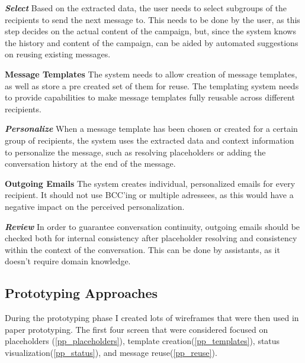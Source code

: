 \textbf{\emph{Select}}
Based on the extracted data, the user needs to select subgroups of the recipients to send the next message to. This needs to be done by the user, as this step decides on the actual content of the campaign, but, since the system knows the history and content of the campaign, can be aided by automated suggestions on reusing existing messages.

\textbf{Message Templates}
The system needs to allow creation of message templates, as well as store a pre created set of them for reuse. The templating system needs to provide capabilities to make message templates fully reusable across different recipients.

\textbf{\emph{Personalize}}
When a message template has been chosen or created for a certain group of recipients, the system uses the extracted data and context information to personalize the message, such as resolving placeholders or adding the conversation history at the end of the message.

\textbf{Outgoing Emails}
The system creates individual, personalized emails for every recipient. It should not use BCC’ing or multiple adressees, as this would have a negative impact on the perceived personalization.

\textbf{\emph{Review}}
In order to guarantee conversation continuity, outgoing emails should be checked both for internal consistency after placeholder resolving and consistency within the context of the conversation. This can be done by assistants, as it doesn’t require domain knowledge.

\subsection{Prototyping Approaches}

During the prototyping phase I created lots of wireframes that were then used in paper prototyping.
The first four screen that were considered focused on placeholders (\autoref{pp_placeholders}), template creation(\autoref{pp_templates}), status visualization(\autoref{pp_status}), and message reuse(\autoref{pp_reuse}).




